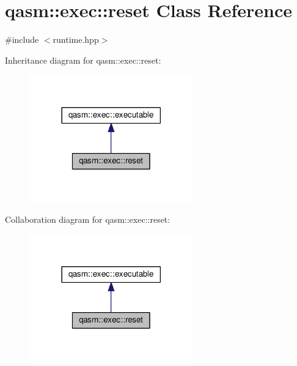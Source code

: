 \hypertarget{classqasm_1_1exec_1_1reset}{}\section{qasm\+:\+:exec\+:\+:reset Class Reference}
\label{classqasm_1_1exec_1_1reset}


{\ttfamily \#include $<$runtime.\+hpp$>$}



Inheritance diagram for qasm\+:\+:exec\+:\+:reset\+:\nopagebreak
\begin{figure}[H]
\begin{center}
\leavevmode
\includegraphics[width=201pt]{classqasm_1_1exec_1_1reset__inherit__graph}
\end{center}
\end{figure}


Collaboration diagram for qasm\+:\+:exec\+:\+:reset\+:\nopagebreak
\begin{figure}[H]
\begin{center}
\leavevmode
\includegraphics[width=201pt]{classqasm_1_1exec_1_1reset__coll__graph}
\end{center}
\end{figure}
